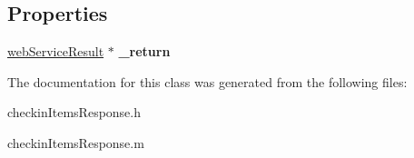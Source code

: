\subsection*{Properties}
\begin{DoxyCompactItemize}
\item 
\hypertarget{interfacecheckin_items_response_a38921311eaa4669d87732e1e4361dfa9}{}\hyperlink{interfaceweb_service_result}{web\+Service\+Result} $\ast$ {\bfseries \+\_\+return}\label{interfacecheckin_items_response_a38921311eaa4669d87732e1e4361dfa9}

\end{DoxyCompactItemize}


The documentation for this class was generated from the following files\+:\begin{DoxyCompactItemize}
\item 
checkin\+Items\+Response.\+h\item 
checkin\+Items\+Response.\+m\end{DoxyCompactItemize}

